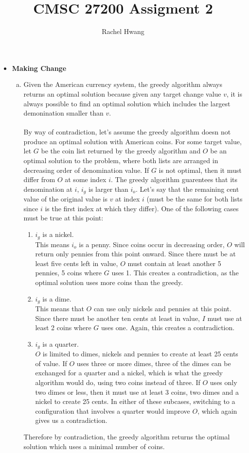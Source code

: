 \documentclass[a4paper]{article}
\title{CMSC 27200 Assigment 2}
\author{Rachel Hwang}
\begin{document}
\maketitle

\begin{itemize}



\item{\textbf{Making Change}}
\begin{enumerate}[a.]
\item Given the American currency system, the greedy algorithm always returns an optimal solution because given any target change value $v$, it is always possible to find an optimal solution which includes the largest demonination smaller than $v$. \\
\\
By way of contradiction, let's assume the greedy algorithm doesn not produce an optimal solution with American coins. For some target value, let $G$ be the coin list returned by the greedy algorithm and $O$ be an optimal solution to the problem, where both lists are arranged in decreasing order of denomination value. If $G$ is not optimal, then it must differ from $O$ at some index $i$. The greedy algorithm guarentees that its denomination at $i$, $i_g$ is larger than $i_o$. Let's say that the remaining cent value of the original value is $v$ at index $i$ (must be the same for both lists since $i$ is the first index at which they differ). One of the following cases must be true at this point:
\begin{enumerate}
\item $i_g$ is a nickel. \\
This means $i_o$ is a penny. Since coins occur in decreasing order, $O$ will return only pennies from this point onward. Since there must be at least five cents left in value, $O$ must contain at least another 5 pennies, 5 coins where $G$ uses 1. This creates a contradiction, as the optimal solution uses more coins than the greedy.
\item $i_g$ is a dime. \\
This means that $O$ can use only nickels and pennies at this point. Since there must be another ten cents at least in value, $I$ must use at least 2 coins where $G$ uses one. Again, this creates a contradiction.
\item $i_g$ is a quarter. \\
$O$ is limited to dimes, nickels and pennies to create at least 25 cents of value. If $O$ uses three or more dimes, three of the dimes can be exchanged for a quarter and a nickel, which is what the greedy algorithm would do, using two coins instead of three. If $O$ uses only two dimes or less, then it must use at least 3 coins, two dimes and a nickel to create 25 cents. In either of these subcases, switching to a configuration that involves a quarter would improve $O$, which again gives us a contradiction.
\end{enumerate}
Therefore by contradiction, the greedy algorithm returns the optimal solution which uses a minimal number of coins. \\


\end{enumerate}
\end{itemize}
\end{document}
